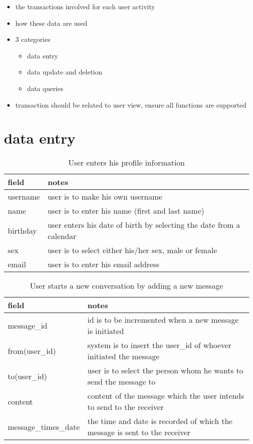 \begin{itemize}
\item the transactions involved for each user activity
\item how these data are used
\item 3 categories
   \begin{itemize}
    \item data entry
    \item data update and deletion
    \item data queries
    \end{itemize}
\item transaction should be related to user view, ensure all functions are supported
\end{itemize}

\section {data entry}

\begin{table}[h]
    \centering
    \begin{tabular}{ll}
    field    & notes\\ \hline
    username & user is to make his own username\\
    name     & user is to enter his name (first and last name)\\
    birthday & user enters his date of birth by selecting the date from a calendar\\
    sex      & user is to select either his/her sex, male or female\\
    email    & user is to enter his email address\\
    \end{tabular}
    \caption{User enters his profile information}
\end{table}

\begin{table}[h]
    \centering
    \begin{tabular}{ll}
    field              & notes\\ \hline
    message\_id         & id is to be incremented when a new message is initiated\\
    from(user\_id)      & system is to insert the user\_id of whoever initiated the message\\
    to(user\_id)        & user is to select the person whom he wants to send the message to\\
    content            & content of the message which the user intends to send to the receiver\\
    message\_times\_date & the time and date is recorded of which the message is sent to the receiver\\
    \end{tabular}
    \caption{User starts a new conversation by adding a new message}
\end{table}

